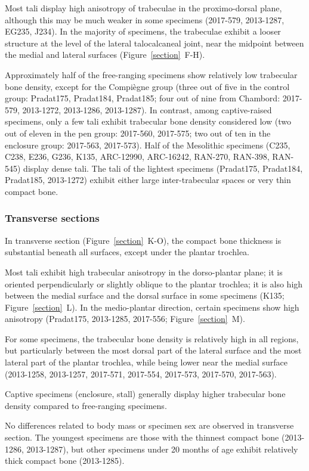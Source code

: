 \documentclass[12pt,a4paper]{article}
\begin{document}
Most tali display high anisotropy of trabeculae in the proximo-dorsal plane, although this may be much weaker in some specimens (2017-579, 2013-1287, EG235, J234). In the majority of specimens, the trabeculae exhibit a looser structure at the level of the lateral talocalcaneal joint, near the midpoint between the medial and lateral surfaces (Figure~\ref{section}~F-H).

Approximately half of the free-ranging specimens show relatively low trabecular bone density, except for the Compiègne group (three out of five in the control group: Pradat175, Pradat184, Pradat185; four out of nine from Chambord: 2017-579, 2013-1272, 2013-1286, 2013-1287). In contrast, among captive-raised specimens, only a few tali exhibit trabecular bone density considered low (two out of eleven in the pen group: 2017-560, 2017-575; two out of ten in the enclosure group: 2017-563, 2017-573). Half of the Mesolithic specimens (C235, C238, E236, G236, K135, ARC-12990, ARC-16242, RAN-270, RAN-398, RAN-545) display dense tali. The tali of the lightest specimens (Pradat175, Pradat184, Pradat185, 2013-1272) exhibit either large inter-trabecular spaces or very thin compact bone.
 
\subsubsection{Transverse sections}
In transverse section (Figure~\ref{section}~K-O), the compact bone thickness is substantial beneath all surfaces, except under the plantar trochlea.

Most tali exhibit high trabecular anisotropy in the dorso-plantar plane; it is oriented perpendicularly or slightly oblique to the plantar trochlea; it is also high between the medial surface and the dorsal surface in some specimens (K135; Figure~\ref{section}~L). In the medio-plantar direction, certain specimens show high anisotropy (Pradat175, 2013-1285, 2017-556; Figure~\ref{section}~M).

For some specimens, the trabecular bone density is relatively high in all regions, but particularly between the most dorsal part of the lateral surface and the most lateral part of the plantar trochlea, while being lower near the medial surface (2013-1258, 2013-1257, 2017-571, 2017-554, 2017-573, 2017-570, 2017-563).

Captive specimens (enclosure, stall) generally display higher trabecular bone density compared to free-ranging specimens.

No differences related to body mass or specimen sex are observed in transverse section. The youngest specimens are those with the thinnest compact bone (2013-1286, 2013-1287), but other specimens under 20 months of age exhibit relatively thick compact bone (2013-1285).
\end{document}

